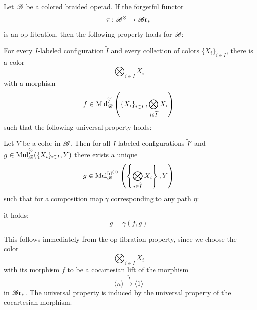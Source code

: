 \begin{rem}
    Let $\mathscr{B}$ be a colored braided operad. 
    If the forgetful functor
    \[
        \pi \colon \mathscr{B}^{\otimes} \to \mathscr{B} \text{r}_{\ast}
    \]
    is an op-fibration, then the following property holds for $\mathscr{B}$:

    For every $I$-labeled
    configuration $\widetilde{I}$ and every collection of colors $\{X_i\}_{i \in I}$,
    there is a color
    \[
    \bigotimes_{i \in \widetilde{I}} X_i
    \]
    with a morphism
    \[
    f \in \operatorname{Mul}_{\mathscr{B}}^{\widetilde{I}}\left(\left\{X_i\right\}_{i \in I}, \bigotimes_{i \in \widetilde{I}} X_i\right)
    \]
    such that the following universal property holds:
    
    Let $Y$ be a color in
    $\mathscr{B}$. Then for all $I$-labeled configurations $\widetilde{I}'$ and $g \in
    \operatorname{Mul}_{\mathscr{B}}^{\widetilde{I}'}(\{X_i\}_{i \in I}, Y)$ there exists a unique
    $$\bar{g} \in \operatorname{Mul}_{\mathscr{B}}^{\operatorname{Id}^{(1)}}\left(\left\{\bigotimes_{i \in
    \widetilde{I}} X_i\right\}, Y\right)$$
    such that for a composition map $\gamma$ corresponding to any path $\eta$:
    \begin{center}
    \end{center}
    it holds:
    \[
        g = \gamma(f, \bar{g})
    \]

    This follows immediately from the op-fibration property, since
    we choose the color 
    \[
    \bigotimes_{i \in \widetilde{I}} X_i
    \]
    with its morphism $f$ to be a cocartesian lift of the morphism
    \[
        \langle n \rangle \overset{\widetilde{I}}{\to} \langle 1 \rangle
    \]
    in $\mathscr{B} \text{r}_{\ast}$. The universal property is induced 
    by the universal property of the cocartesian morphism.
\end{rem}




